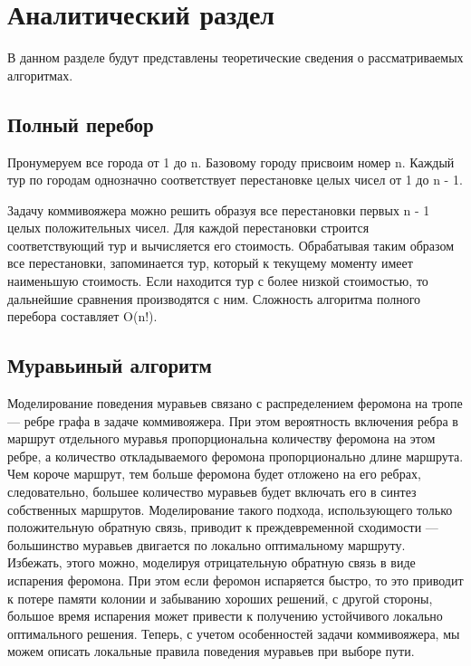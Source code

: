 \chapter{Аналитический раздел}

В данном разделе будут представлены теоретические сведения о рассматриваемых алгоритмах.

\section{Полный перебор}

Пронумеруем все города от 1 до n. Базовому городу присвоим номер n. Каждый тур по
городам однозначно соответствует перестановке целых чисел от 1 до n - 1.

Задачу коммивояжера можно решить образуя все перестановки первых n - 1 целых положительных чисел. Для каждой перестановки строится соответствующий тур и вычисляется
его стоимость. Обрабатывая таким образом все перестановки, запоминается тур, который к
текущему моменту имеет наименьшую стоимость. Если находится тур с более низкой стоимостью, то дальнейшие сравнения производятся с ним. Сложность алгоритма полного перебора составляет O(n!). \cite{enum}

\section{Муравьиный алгоритм}

Моделирование поведения муравьев связано с распределением феромона на тропе —
ребре графа в задаче коммивояжера. При этом вероятность включения ребра в маршрут отдельного муравья пропорциональна количеству феромона на этом ребре, а количество откладываемого феромона пропорционально длине маршрута. Чем короче маршрут, тем больше
феромона будет отложено на его ребрах, следовательно, большее количество муравьев будет включать его в синтез собственных маршрутов. Моделирование такого подхода, использующего только положительную обратную связь, приводит к преждевременной сходимости
— большинство муравьев двигается по локально оптимальному маршруту. Избежать, этого
можно, моделируя отрицательную обратную связь в виде испарения феромона. При этом если
феромон испаряется быстро, то это приводит к потере памяти колонии и забыванию хороших
решений, с другой стороны, большое время испарения может привести к получению устойчивого локально оптимального решения. Теперь, с учетом особенностей задачи коммивояжера,
мы можем описать локальные правила поведения муравьев при выборе пути.

